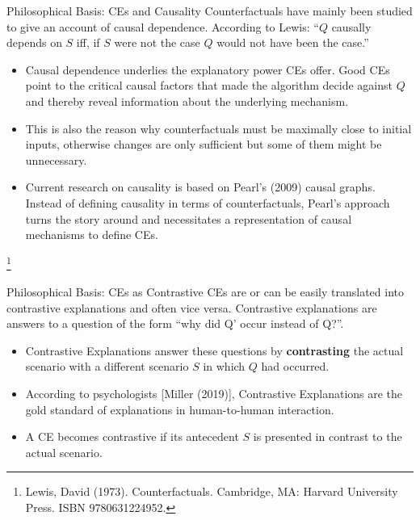\documentclass[11pt,compress,t,notes=noshow, xcolor=table]{beamer}
\begin{document}
\begin{vbframe}{Philosophical Basis: CEs and Causality}
Counterfactuals have mainly been studied to give an account of causal dependence. According to Lewis:\newline
``$Q$ causally depends on $S$ iff, if $S$ were not the case $Q$ would not have been the case.''
	\begin{itemize}
		\item Causal dependence underlies the explanatory power CEs offer. Good CEs point to the critical causal factors that made the algorithm decide against $Q$ and thereby reveal information about the underlying mechanism.
		\item This is also the reason why counterfactuals must be maximally close to initial inputs, otherwise changes are only sufficient but some of them might be unnecessary.
		\item Current research on causality is based on Pearl's (2009) causal graphs. Instead of defining causality in terms of counterfactuals, Pearl's approach turns the story around and necessitates a representation of causal mechanisms to define CEs. 
	\end{itemize}
\footnote[frame]{Lewis, David (1973). Counterfactuals. Cambridge, MA: Harvard University Press. ISBN 9780631224952. }
\end{vbframe}

\begin{vbframe}{Philosophical Basis: CEs as Contrastive}
CEs are or can be easily translated into contrastive explanations and often vice versa. Contrastive explanations are answers to a question of the form ``why did Q' occur instead of Q?''.
	\begin{itemize}
	    \item  Contrastive Explanations answer these questions by \textbf{contrasting} the actual scenario with a different scenario $S$ in which $Q$ had occurred.
		\item According to psychologists [Miller (2019)], Contrastive Explanations are the gold standard of explanations in human-to-human interaction.
		\item A CE becomes contrastive if its antecedent $S$ is presented in contrast to the actual scenario.
	\end{itemize}
\end{vbframe}
\end{document}
